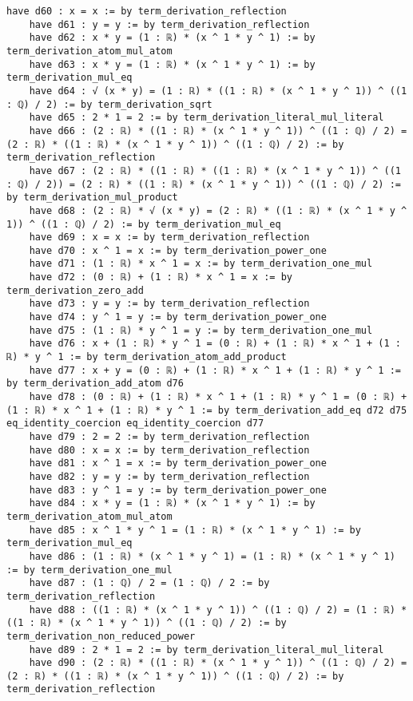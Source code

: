 \documentclass{article}
\begin{document}
\begin{tcolorbox}[colback=white!10, width=\linewidth]
\begin{lstlisting}[language=Lean4]
    have d60 : x = x := by term_derivation_reflection
    have d61 : y = y := by term_derivation_reflection
    have d62 : x * y = (1 : ℝ) * (x ^ 1 * y ^ 1) := by term_derivation_atom_mul_atom
    have d63 : x * y = (1 : ℝ) * (x ^ 1 * y ^ 1) := by term_derivation_mul_eq
    have d64 : √ (x * y) = (1 : ℝ) * ((1 : ℝ) * (x ^ 1 * y ^ 1)) ^ ((1 : ℚ) / 2) := by term_derivation_sqrt
    have d65 : 2 * 1 = 2 := by term_derivation_literal_mul_literal
    have d66 : (2 : ℝ) * ((1 : ℝ) * (x ^ 1 * y ^ 1)) ^ ((1 : ℚ) / 2) = (2 : ℝ) * ((1 : ℝ) * (x ^ 1 * y ^ 1)) ^ ((1 : ℚ) / 2) := by term_derivation_reflection
    have d67 : (2 : ℝ) * ((1 : ℝ) * ((1 : ℝ) * (x ^ 1 * y ^ 1)) ^ ((1 : ℚ) / 2)) = (2 : ℝ) * ((1 : ℝ) * (x ^ 1 * y ^ 1)) ^ ((1 : ℚ) / 2) := by term_derivation_mul_product
    have d68 : (2 : ℝ) * √ (x * y) = (2 : ℝ) * ((1 : ℝ) * (x ^ 1 * y ^ 1)) ^ ((1 : ℚ) / 2) := by term_derivation_mul_eq
    have d69 : x = x := by term_derivation_reflection
    have d70 : x ^ 1 = x := by term_derivation_power_one
    have d71 : (1 : ℝ) * x ^ 1 = x := by term_derivation_one_mul
    have d72 : (0 : ℝ) + (1 : ℝ) * x ^ 1 = x := by term_derivation_zero_add
    have d73 : y = y := by term_derivation_reflection
    have d74 : y ^ 1 = y := by term_derivation_power_one
    have d75 : (1 : ℝ) * y ^ 1 = y := by term_derivation_one_mul
    have d76 : x + (1 : ℝ) * y ^ 1 = (0 : ℝ) + (1 : ℝ) * x ^ 1 + (1 : ℝ) * y ^ 1 := by term_derivation_atom_add_product
    have d77 : x + y = (0 : ℝ) + (1 : ℝ) * x ^ 1 + (1 : ℝ) * y ^ 1 := by term_derivation_add_atom d76
    have d78 : (0 : ℝ) + (1 : ℝ) * x ^ 1 + (1 : ℝ) * y ^ 1 = (0 : ℝ) + (1 : ℝ) * x ^ 1 + (1 : ℝ) * y ^ 1 := by term_derivation_add_eq d72 d75 eq_identity_coercion eq_identity_coercion d77
    have d79 : 2 = 2 := by term_derivation_reflection
    have d80 : x = x := by term_derivation_reflection
    have d81 : x ^ 1 = x := by term_derivation_power_one
    have d82 : y = y := by term_derivation_reflection
    have d83 : y ^ 1 = y := by term_derivation_power_one
    have d84 : x * y = (1 : ℝ) * (x ^ 1 * y ^ 1) := by term_derivation_atom_mul_atom
    have d85 : x ^ 1 * y ^ 1 = (1 : ℝ) * (x ^ 1 * y ^ 1) := by term_derivation_mul_eq
    have d86 : (1 : ℝ) * (x ^ 1 * y ^ 1) = (1 : ℝ) * (x ^ 1 * y ^ 1) := by term_derivation_one_mul
    have d87 : (1 : ℚ) / 2 = (1 : ℚ) / 2 := by term_derivation_reflection
    have d88 : ((1 : ℝ) * (x ^ 1 * y ^ 1)) ^ ((1 : ℚ) / 2) = (1 : ℝ) * ((1 : ℝ) * (x ^ 1 * y ^ 1)) ^ ((1 : ℚ) / 2) := by term_derivation_non_reduced_power
    have d89 : 2 * 1 = 2 := by term_derivation_literal_mul_literal
    have d90 : (2 : ℝ) * ((1 : ℝ) * (x ^ 1 * y ^ 1)) ^ ((1 : ℚ) / 2) = (2 : ℝ) * ((1 : ℝ) * (x ^ 1 * y ^ 1)) ^ ((1 : ℚ) / 2) := by term_derivation_reflection

\end{lstlisting}
\end{tcolorbox}
\end{document}
